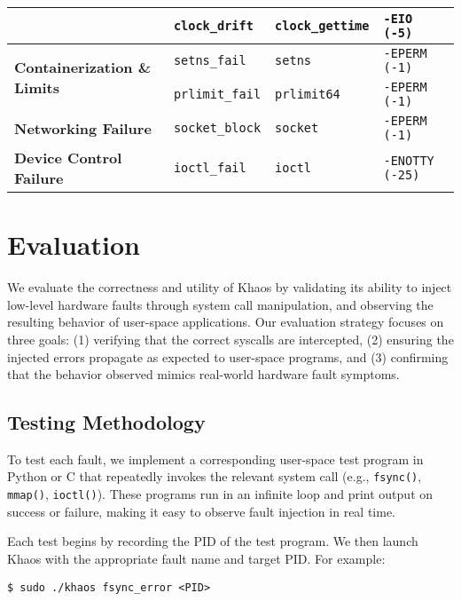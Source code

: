 \begin{table}[ht]
{\begin{tabular}{l|l|l|l}
    & \texttt{clock\_drift}        & \texttt{clock\_gettime}& \texttt{-EIO (-5)} \\
\midrule
\multirow{2}{*}{\textbf{Containerization \& Limits}} 
    & \texttt{setns\_fail}         & \texttt{setns}        & \texttt{-EPERM (-1)} \\
    & \texttt{prlimit\_fail}       & \texttt{prlimit64}    & \texttt{-EPERM (-1)} \\
\midrule
\textbf{Networking Failure} 
    & \texttt{socket\_block}       & \texttt{socket}       & \texttt{-EPERM (-1)} \\
\midrule
\textbf{Device Control Failure} 
    & \texttt{ioctl\_fail}         & \texttt{ioctl}        & \texttt{-ENOTTY (-25)} \\
\bottomrule
\end{tabular}
}
\end{table}

\section{Evaluation}

We evaluate the correctness and utility of Khaos by validating its ability to inject low-level hardware faults through system call manipulation, and observing the resulting behavior of user-space applications. Our evaluation strategy focuses on three goals: (1) verifying that the correct syscalls are intercepted, (2) ensuring the injected errors propagate as expected to user-space programs, and (3) confirming that the behavior observed mimics real-world hardware fault symptoms.

\subsection{Testing Methodology}

To test each fault, we implement a corresponding user-space test program in Python or C that repeatedly invokes the relevant system call (e.g., \texttt{fsync()}, \texttt{mmap()}, \texttt{ioctl()}). These programs run in an infinite loop and print output on success or failure, making it easy to observe fault injection in real time.

Each test begins by recording the PID of the test program. We then launch Khaos with the appropriate fault name and target PID. For example:
\begin{verbatim}
$ sudo ./khaos fsync_error <PID>
\end{verbatim}


